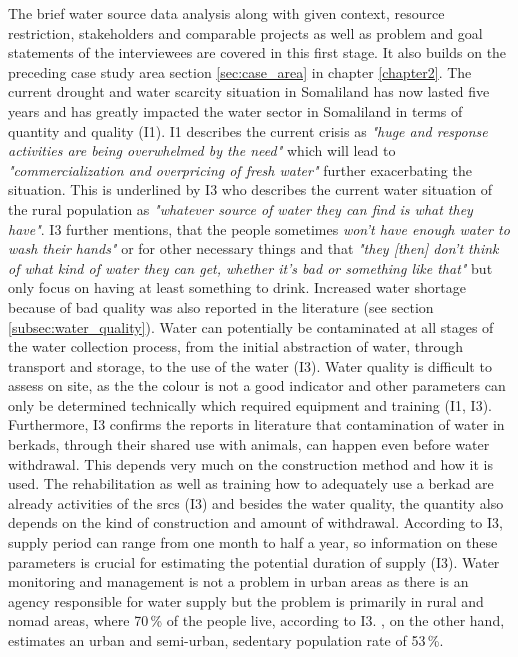 The brief water source data analysis along with given context, resource restriction, stakeholders and comparable projects as well as problem and goal statements of the interviewees are covered in this first stage. It also builds on the preceding case study area section \ref{sec:case_area} in chapter \ref{chapter2}.\newline
The current drought and water scarcity situation in Somaliland has now lasted five years and has greatly impacted the water sector in Somaliland in terms of quantity and quality (I1). I1 describes the current crisis as \textit{"huge and response activities are being overwhelmed by the need"} which will lead to \textit{"commercialization and overpricing of fresh water"} further exacerbating the situation. This is underlined by I3 who describes the current water situation of the rural population as \textit{"whatever source of water they can find is what they have"}. I3 further mentions, that the people sometimes \textit{won't have enough water to wash their hands"} or for other necessary things and that \textit{"they [then] don't think of what kind of water they can get, whether it's bad or something like that"} but only focus on having at least something to drink. Increased water shortage because of bad quality was also reported in the literature (see section \ref*{subsec:water_quality}). Water can potentially be contaminated at all stages of the water collection process, from the initial abstraction of water, through transport and storage, to the use of the water (I3). Water quality is difficult to assess on site, as the the colour is not a good indicator and other parameters can only be determined technically which required equipment and training (I1, I3). Furthermore, I3 confirms the reports in literature that contamination of water in berkads, through their shared use with animals, can happen even before water withdrawal. This depends very much on the construction method and how it is used. The rehabilitation as well as training how to adequately use a berkad are already activities of the \acrshort*{srcs} (I3) and besides the water quality, the quantity also depends on the kind of construction and amount of withdrawal. According to I3, supply period can range from one month to half a year, so information on these parameters is crucial for estimating the potential duration of supply (I3).\newline
Water monitoring and management is not a problem in urban areas as there is an agency responsible for water supply but the problem is primarily in rural and nomad areas, where 70\,\% of the people live, according to I3. \autocite{republicofsomaliaCountryProfile20212021}, on the other hand, estimates an urban and semi-urban, sedentary population rate of 53\,\%.\newline
